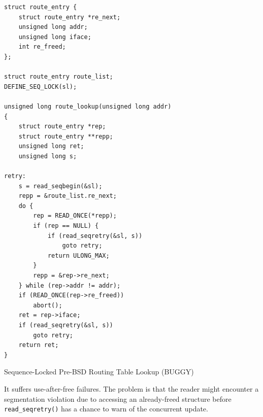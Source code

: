 \documentclass[11pt]{article}
\begin{document}
\begin{listing}[htbp]
\begin{verbatim}
struct route_entry {
    struct route_entry *re_next;
    unsigned long addr;
    unsigned long iface;
    int re_freed;
};

struct route_entry route_list;
DEFINE_SEQ_LOCK(sl);

unsigned long route_lookup(unsigned long addr)
{
    struct route_entry *rep;
    struct route_entry **repp;
    unsigned long ret;
    unsigned long s;

retry:
    s = read_seqbegin(&sl);
    repp = &route_list.re_next;
    do {
        rep = READ_ONCE(*repp);
        if (rep == NULL) {
            if (read_seqretry(&sl, s))
                goto retry;
            return ULONG_MAX;
        }
        repp = &rep->re_next;
    } while (rep->addr != addr);
    if (READ_ONCE(rep->re_freed))
        abort();
    ret = rep->iface;
    if (read_seqretry(&sl, s))
        goto retry;
    return ret;
}
\end{verbatim}
\caption{\label{l9.11}Sequence-Locked Pre-BSD Routing Table Lookup (BUGGY)}
\end{listing}

It suffers use-after-free failures. The problem is that the reader might encounter a segmentation
violation due to accessing an already-freed structure before \texttt{read\_seqretry()} has a chance to warn of
the concurrent update.
\end{document}
